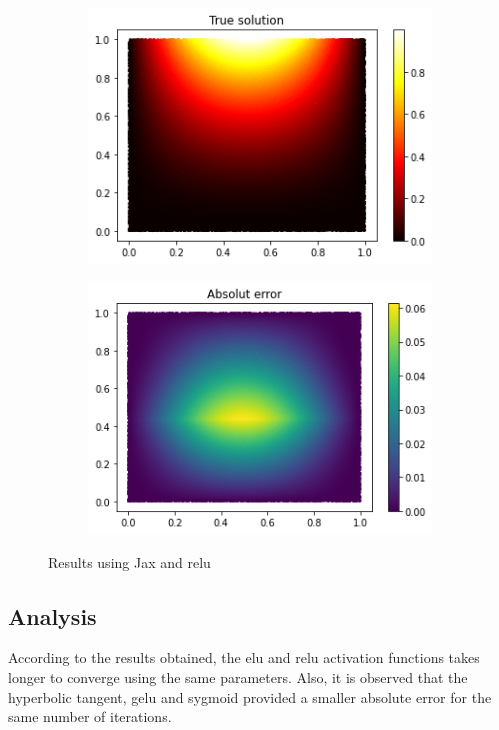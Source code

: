 \begin{figure}[H]
\begin{subfigure}{.45\textwidth}
    \includegraphics[width=.8\linewidth]{images/NN_Jax_PDE8_files_relu/NN_Jax_PDE8_22_0.png}
    \label{fig:sub3}
    \end{subfigure}
\begin{subfigure}{.45\textwidth}
    \centering
    \includegraphics[width=.8\linewidth]{images/NN_Jax_PDE8_files_relu/NN_Jax_PDE8_24_0.png}
    \label{fig:sub4}
\end{subfigure}
\caption{Results using Jax and relu}
\label{fig:test}
\end{figure}


\vspace{-0.5cm}
\subsection{Analysis}
According to the results obtained, the elu and relu activation functions takes longer to converge using the same parameters. Also, it is observed that the hyperbolic tangent, gelu and sygmoid provided a smaller absolute error for the same number of iterations.
\newpage

